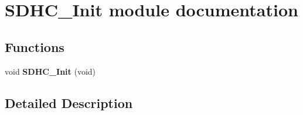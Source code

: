 \hypertarget{group___s_d_h_c___init__module}{}\section{S\+D\+H\+C\+\_\+\+Init module documentation}
\label{group___s_d_h_c___init__module}
\subsection*{Functions}
\begin{DoxyCompactItemize}
\item 
void {\bfseries S\+D\+H\+C\+\_\+\+Init} (void)\hypertarget{group___s_d_h_c___init__module_ga524132c89a902911ef03eff6a20011d8}{}\label{group___s_d_h_c___init__module_ga524132c89a902911ef03eff6a20011d8}

\end{DoxyCompactItemize}


\subsection{Detailed Description}
